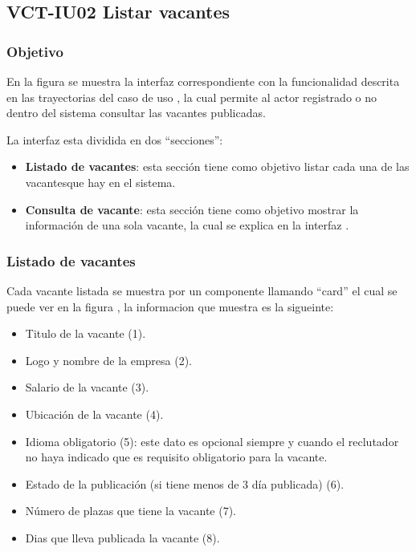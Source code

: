 \clearpage
\subsection{VCT-IU02 Listar vacantes}

\subsubsection{Objetivo}
En la figura  se muestra la interfaz correspondiente con la funcionalidad descrita en las
trayectorias del caso de uso  , la cual permite al actor registrado o no dentro del sistema consultar 
las vacantes publicadas.

La interfaz esta dividida en dos ``secciones'':
\begin{itemize}
   \item \textbf{Listado de vacantes}: esta sección tiene como objetivo listar cada una de las vacantesque hay en el sistema.
   \item \textbf{Consulta de vacante}: esta sección tiene como objetivo mostrar la información de una sola vacante, la cual se explica en 
   la interfaz .
\end{itemize}


\subsubsection{Listado de vacantes}
Cada vacante listada se muestra por un componente llamando ``card'' el cual se puede ver en la figura , la informacion que 
muestra es la sigueinte: 
\begin{itemize}
   \item Titulo de la vacante (1).
   \item Logo y nombre de la empresa (2).
   \item Salario de la vacante (3).
   \item Ubicación de la vacante (4).
   \item Idioma obligatorio (5): este dato es opcional siempre y cuando el reclutador no haya indicado que es requisito obligatorio 
   para la vacante.
   \item Estado de la publicación (si tiene menos de 3 día publicada) (6).
   \item Número de plazas que tiene la vacante (7).
   \item Dias que lleva publicada la vacante (8).
\end{itemize}

